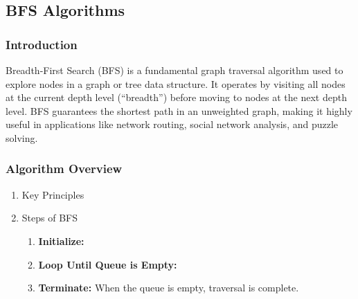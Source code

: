 \subsection{BFS Algorithms}
\subsubsection{Introduction}
Breadth-First Search (BFS) is a fundamental graph traversal algorithm used to explore nodes in a graph or tree data structure. It operates by visiting all nodes at the current depth level (``breadth'') before moving to nodes at the next depth level. BFS guarantees the shortest path in an unweighted graph, making it highly useful in applications like network routing, social network analysis, and puzzle solving.

\subsubsection{Algorithm Overview}
\begin{enumerate}
	\item Key Principles

	\item Steps of BFS
	      \begin{enumerate}
		      \item \textbf{Initialize:}
		      \item \textbf{Loop Until Queue is Empty:}
		      \item \textbf{Terminate:} When the queue is empty, traversal is complete.
	      \end{enumerate}
\end{enumerate}

